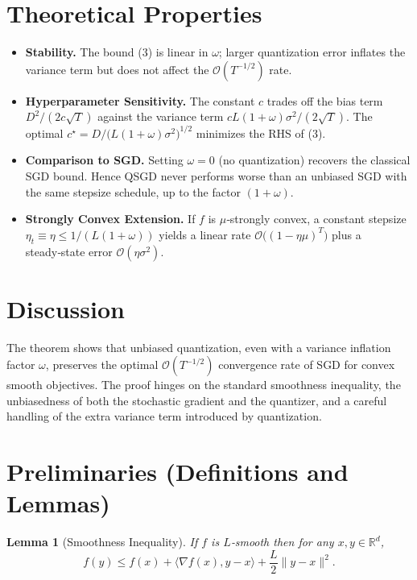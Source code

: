 \documentclass{article}
\newtheorem{lemma}{Lemma}
\newcommand{\R}{\mathbb{R}}
\begin{document}
\section*{Theoretical Properties}
\begin{itemize}
    \item \textbf{Stability.} The bound (3) is linear in $\omega$; larger quantization error inflates the variance term but does not affect the $\mathcal O(T^{-1/2})$ rate.
    \item \textbf{Hyperparameter Sensitivity.} The constant $c$ trades off the bias term $D^{2}/(2c\sqrt{T})$ against the variance term $cL(1+\omega)\sigma^{2}/(2\sqrt{T})$. The optimal $c^{\star}=D/\bigl(L(1+\omega)\sigma^{2}\bigr)^{1/2}$ minimizes the RHS of (3).
    \item \textbf{Comparison to SGD.} Setting $\omega=0$ (no quantization) recovers the classical SGD bound. Hence QSGD never performs worse than an unbiased SGD with the same stepsize schedule, up to the factor $(1+\omega)$.
    \item \textbf{Strongly Convex Extension.} If $f$ is $\mu$‑strongly convex, a constant stepsize $\eta_{t}\equiv\eta\le 1/(L(1+\omega))$ yields a linear rate $\mathcal O\!\bigl((1-\eta\mu)^{T}\bigr)$ plus a steady‑state error $\mathcal O(\eta\sigma^{2})$.
\end{itemize}

\section*{Discussion}
The theorem shows that unbiased quantization, even with a variance inflation factor $\omega$, preserves the optimal $\mathcal O(T^{-1/2})$ convergence rate of SGD for convex smooth objectives. The proof hinges on the standard smoothness inequality, the unbiasedness of both the stochastic gradient and the quantizer, and a careful handling of the extra variance term introduced by quantization.

\newpage

\section*{Preliminaries (Definitions and Lemmas)}
\begin{lemma}[Smoothness Inequality]\label{lem:smooth}
If $f$ is $L$‑smooth then for any $x,y\in\R^{d}$,
\[
f(y)\le f(x)+\langle\nabla f(x),y-x\rangle+\frac{L}{2}\|y-x\|^{2}.
\]
\end{lemma}
\end{document}
